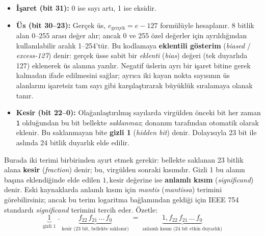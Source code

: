 \begin{itemize}
  \item \textbf{İşaret (bit 31):} 0 ise sayı artı, 1 ise eksidir.

  \item \textbf{Üs (bit 30--23):} Gerçek üs, $e_{\text{gerçek}} = e - 127$ formülüyle hesaplanır. 8 bitlik alan 0--255 arası değer alır; ancak 0 ve 255 özel değerler için ayrıldığından kullanılabilir aralık 1--254'tür. Bu kodlamaya \textbf{eklentili gösterim} (\emph{biased} / \emph{excess-127}) denir: gerçek üsse sabit bir \emph{eklenti} (\emph{bias}) değeri (tek duyarlıda 127) eklenerek üs alanına yazılır. Negatif üslerin ayrı bir işaret bitine gerek kalmadan ifade edilmesini sağlar; ayrıca iki kayan nokta sayısının üs alanlarını işaretsiz tam sayı gibi karşılaştırarak büyüklük sıralamaya olanak tanır.

  \item \textbf{Kesir (bit 22--0):} Olağanlaştırılmış sayılarda virgülden önceki bit her zaman \texttt{1} olduğundan bu bit bellekte \emph{saklanmaz}; donanım tarafından otomatik olarak eklenir. Bu saklanmayan bite \textbf{gizli 1} (\emph{hidden bit}) denir. Dolayısıyla 23 bit ile aslında 24 bitlik duyarlık elde edilir.
\end{itemize}

Burada iki terimi birbirinden ayırt etmek gerekir: bellekte saklanan 23 bitlik alana \textbf{kesir} (\emph{fraction}) denir; bu, virgülden sonraki kısımdır. Gizli 1 bu alanın başına eklendiğinde elde edilen $1{,}\text{kesir}$ değerine ise \textbf{anlamlı kısım} (\emph{significand}) denir. Eski kaynaklarda anlamlı kısım için \emph{mantis} (\emph{mantissa}) terimini görebilirsiniz; ancak bu terim logaritma bağlamından geldiği için IEEE 754 standardı \emph{significand} terimini tercih eder. Özetle:
\[
\underbrace{1}_{\text{gizli 1}}\;.\;\underbrace{f_{22}\,f_{21}\,\ldots\,f_0}_{\text{kesir (23 bit, bellekte saklanır)}} \;=\; \underbrace{1{,}f_{22}\,f_{21}\,\ldots\,f_0}_{\text{anlamlı kısım (24 bit etkin duyarlık)}}
\]

